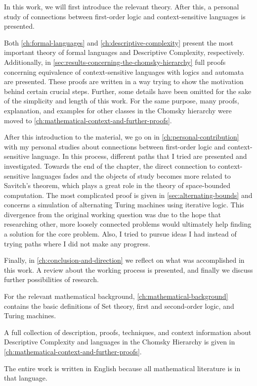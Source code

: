 In this work, we will first introduce the relevant theory.
After this, a personal study of connections between first-order logic and context-sensitive languages is presented.

Both \cref{ch:formal-languages} and \cref{ch:descriptive-complexity} present the most important theory of formal languages and Descriptive Complexity, respectively.
Additionally, in \cref{sec:results-concerning-the-chomsky-hierarchy} full proofs concerning equivalence of context-sensitive languages with logics and automata are presented.
These proofs are written in a way trying to show the motivation behind certain crucial steps.
Further, some details have been omitted for the sake of the simplicity and length of this work.
For the same purpose, many proofs, explanation, and examples for other classes in the Chomsky hierarchy were moved to \cref{ch:mathematical-context-and-further-proofs}.

After this introduction to the material, we go on in \cref{ch:personal-contribution} with my personal studies about connections between first-order logic and context-sensitive language.
In this process, different paths that I tried are presented and investigated.
Towards the end of the chapter, the direct connection to context-sensitive languages fades and the objects of study becomes more related to Savitch's theorem, which plays a great role in the theory of space-bounded computation.
The most complicated proof is given in \cref{sec:alternating-bounds} and concerns a simulation of alternating Turing machines using iterative logic.
This divergence from the original working question was due to the hope that researching other, more loosely connected problems would ultimately help finding a solution for the core problem.
Also, I tried to pursue ideas I had instead of trying paths where I did not make any progress.

Finally, in \cref{ch:conclusion-and-direction} we reflect on what was accomplished in this work.
A review about the working process is presented, and finally we discuss further possibilities of research.

For the relevant mathematical background, \cref{ch:mathematical-background} contains the basic definitions of Set theory, first and second-order logic, and Turing machines.

A full collection of description, proofs, techniques, and context information about Descriptive Complexity and languages in the Chomsky Hierarchy is given in \cref{ch:mathematical-context-and-further-proofs}.

The entire work is written in English because all mathematical literature is in that language.